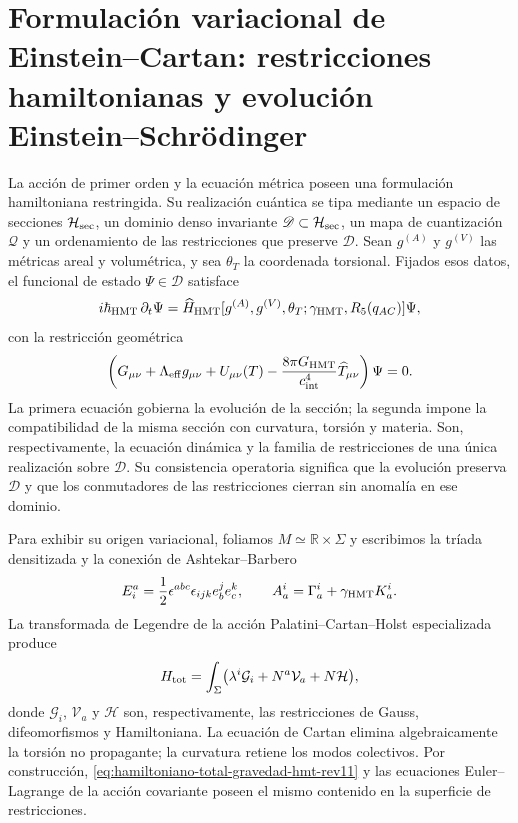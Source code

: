 \section{Formulación variacional de Einstein--Cartan: restricciones
hamiltonianas y evolución Einstein--Schrödinger}
\label{sec:gravedad-einstein-schrodinger-hamiltoniana-rev11}

La acción de primer orden y la ecuación métrica poseen una formulación
hamiltoniana restringida. Su realización cuántica se tipa mediante un espacio
de secciones \(\mathcal H_{\rm sec}\), un dominio denso invariante
\(\mathscr D\subset\mathcal H_{\rm sec}\), un mapa de cuantización
\(\mathcal Q\) y un ordenamiento de las restricciones que preserve
\(\mathscr D\). Sean \(g^{(A)}\) y \(g^{(V)}\) las métricas areal y
volumétrica, y sea \(\theta_T\) la coordenada torsional. Fijados esos datos,
el funcional de estado \(\Psi\in\mathscr D\) satisface
\begin{equation}
 i\hbar_{\rm HMT}\,\partial_t\Psi
 =\widehat H_{\rm HMT}
 [g^{(A)},g^{(V)},\theta_T;\gamma_{\rm HMT},R_5(q_{AC})]\Psi,
 \label{eq:einstein-schrodinger-hmt-rev11}
\end{equation}
con la restricción geométrica
\begin{equation}
 \left(
 G_{\mu\nu}+\Lambda_{\rm eff}g_{\mu\nu}
 +U_{\mu\nu}(T)
 -\frac{8\pi G_{\rm HMT}}{c_{\rm int}^4}
 \widehat T_{\mu\nu}
 \right)\Psi=0.
 \label{eq:restriccion-einstein-schrodinger-hmt-rev11}
\end{equation}
La primera ecuación gobierna la evolución de la sección; la segunda impone
la compatibilidad de la misma sección con curvatura, torsión y materia. Son,
respectivamente, la ecuación dinámica y la familia de restricciones de una
única realización sobre \(\mathscr D\). Su consistencia operatoria significa
que la evolución preserva \(\mathscr D\) y que los conmutadores de las
restricciones cierran sin anomalía en ese dominio.

Para exhibir su origen variacional, foliamos
\(M\simeq\mathbb R\times\Sigma\) y escribimos la tríada densitizada y la
conexión de Ashtekar--Barbero
\[
 E_i^a=\frac12\epsilon^{abc}\epsilon_{ijk}e_b^je_c^k,
 \qquad
 A_a^i=\Gamma_a^i+\gamma_{\rm HMT}K_a^i.
\]
La transformada de Legendre de la acción
Palatini--Cartan--Holst especializada produce
\begin{equation}
 H_{\rm tot}
 =\int_\Sigma
 \bigl(\lambda^i\mathcal G_i+N^a\mathcal V_a+N\mathcal H\bigr),
 \label{eq:hamiltoniano-total-gravedad-hmt-rev11}
\end{equation}
donde \(\mathcal G_i\), \(\mathcal V_a\) y \(\mathcal H\) son,
respectivamente, las restricciones de Gauss, difeomorfismos y Hamiltoniana.
La ecuación de Cartan elimina algebraicamente la torsión no propagante; la
curvatura retiene los modos colectivos. Por construcción,
\eqref{eq:hamiltoniano-total-gravedad-hmt-rev11} y las ecuaciones
Euler--Lagrange de la acción covariante poseen el mismo contenido en la
superficie de restricciones.

